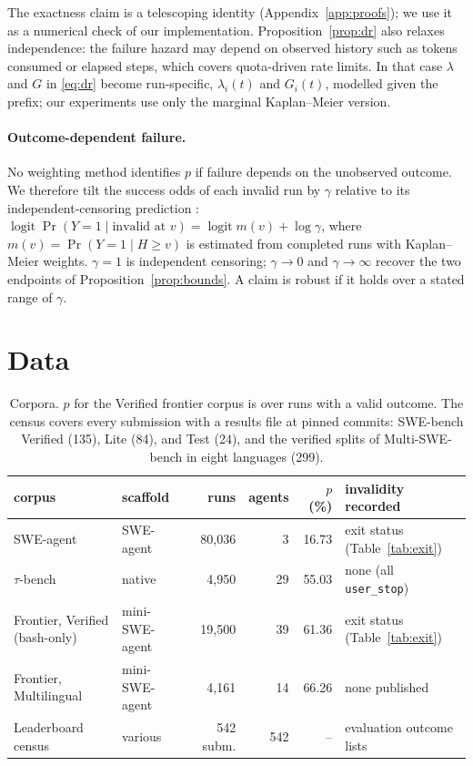\documentclass[11pt]{article}
\theoremstyle{definition}
\theoremstyle{remark}
\begin{document}
The exactness claim is a telescoping identity
(Appendix~\ref{app:proofs}); we use it as a numerical check of our
implementation. Proposition~\ref{prop:dr} also relaxes independence: the
failure hazard may depend on observed history such as tokens consumed or
elapsed steps, which covers quota-driven rate limits. In that case $\lambda$ and
$G$ in \eqref{eq:dr} become run-specific, $\lambda_i(t)$ and $G_i(t)$, modelled
given the prefix; our experiments use only the marginal Kaplan--Meier version.

\paragraph{Outcome-dependent failure.} No weighting method identifies $p$ if
failure depends on the unobserved outcome. We therefore tilt the success odds of
each invalid run by $\gamma$ relative to its independent-censoring prediction
\citep{scharfstein1999adjusting}:
$\operatorname{logit}\Pr(Y=1\mid\text{invalid at }v)=\operatorname{logit}m(v)+\log\gamma$,
where $m(v)=\Pr(Y=1\mid H\ge v)$ is estimated from completed runs with
Kaplan--Meier weights. $\gamma=1$ is independent censoring; $\gamma\to0$ and
$\gamma\to\infty$ recover the two endpoints of Proposition~\ref{prop:bounds}. A
claim is robust if it holds over a stated range of $\gamma$.

\section{Data}
\label{sec:data}

\begin{table}[t]
\centering
\small
\begin{tabular}{@{}llrrrl@{}}
\toprule
corpus & scaffold & runs & agents & $p$ (\%) & invalidity recorded \\
\midrule
SWE-agent \citep{nebius2024trajectories} & SWE-agent & 80{,}036 & 3 & 16.73 &
exit status (Table~\ref{tab:exit}) \\
$\tau$-bench \citep{agentsuite2026taubench} & native & 4{,}950 & 29 & 55.03 & none
(all \texttt{user\_stop}) \\
Frontier, Verified (bash-only) & mini-SWE-agent & 19{,}500 & 39 & 61.36 & exit status
(Table~\ref{tab:exit}) \\
Frontier, Multilingual & mini-SWE-agent & 4{,}161 & 14 & 66.26 & none published \\
Leaderboard census & various & 542 subm. & 542 & -- & evaluation outcome lists \\
\bottomrule
\end{tabular}
\caption{Corpora. $p$ for the Verified frontier corpus is over runs with a valid
outcome. The census covers every submission with a results file at pinned
commits: SWE-bench Verified (135), Lite (84), and Test (24), and the verified
splits of Multi-SWE-bench in eight languages (299).}
\label{tab:data}
\end{table}
\end{document}
